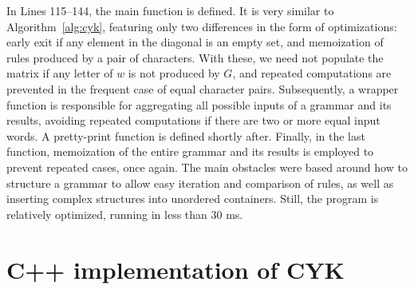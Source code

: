 \documentclass[12pt]{article}
\begin{document}
In Lines 115--144, the main function is defined. It is very similar to Algorithm~\ref{alg:cyk}, featuring only two differences in the form of optimizations: early exit if any element in the diagonal is an empty set, and memoization of rules produced by a pair of characters. With these, we need not populate the matrix if any letter of $w$ is not produced by $G$, and repeated computations are prevented in the frequent case of equal character pairs. Subsequently, a wrapper function is responsible for aggregating all possible inputs of a grammar and its results, avoiding repeated computations if there are two or more equal input words. A pretty-print function is defined shortly after. Finally, in the last function, memoization of the entire grammar and its results is employed to prevent repeated cases, once again. The main obstacles were based around how to structure a grammar to allow easy iteration and comparison of rules, as well as inserting complex structures into unordered containers. Still, the program is relatively optimized, running in less than 30 ms.




\appendix

\section{C++ implementation of CYK}\label{app:impl}

\end{document}

